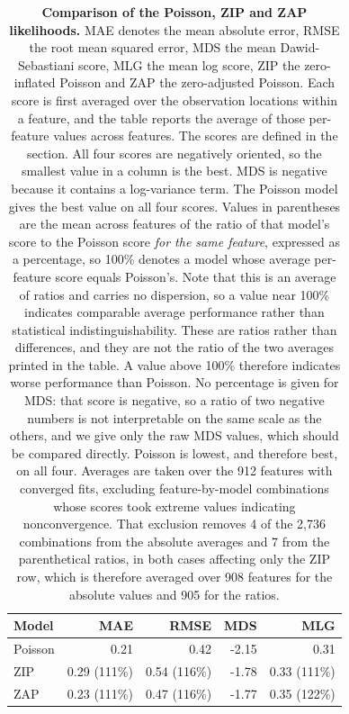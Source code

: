 \documentclass[10pt,letterpaper]{article}
\begin{document}
\begin{table}[!ht]
\centering
\caption{{\bf Comparison of the Poisson, ZIP and ZAP likelihoods.} MAE denotes the mean absolute error, RMSE the root mean squared error, MDS the mean Dawid-Sebastiani score, MLG the mean log score, ZIP the zero-inflated Poisson and ZAP the zero-adjusted Poisson. Each score is first averaged over the observation locations within a feature, and the table reports the average of those per-feature values across features. The scores are defined in the  section. All four scores are negatively oriented, so the smallest value in a column is the best. MDS is negative because it contains a log-variance term. The Poisson model gives the best value on all four scores. Values in parentheses are the mean across features of the ratio of that model's score to the Poisson score \emph{for the same feature}, expressed as a percentage, so 100\% denotes a model whose average per-feature score equals Poisson's. Note that this is an average of ratios and carries no dispersion, so a value near 100\% indicates comparable average performance rather than statistical indistinguishability. These are ratios rather than differences, and they are not the ratio of the two averages printed in the table. A value above 100\% therefore indicates worse performance than Poisson. No percentage is given for MDS: that score is negative, so a ratio of two negative numbers is not interpretable on the same scale as the others, and we give only the raw MDS values, which should be compared directly. Poisson is lowest, and therefore best, on all four. Averages are taken over the 912 features with converged fits, excluding feature-by-model combinations whose scores took extreme values indicating nonconvergence. That exclusion removes 4 of the 2,736 combinations from the absolute averages and 7 from the parenthetical ratios, in both cases affecting only the ZIP row, which is therefore averaged over 908 features for the absolute values and 905 for the ratios.}
\label{tab:lik-comp}
\begin{tabular}{|l|rrrr|}
  \hline
  Model & MAE & RMSE & MDS & MLG \\
  \hline
Poisson & 0.21 & 0.42 & -2.15 & 0.31 \\
ZIP & 0.29 (111\%) & 0.54 (116\%) & -1.78 & 0.33 (111\%) \\
ZAP & 0.23 (111\%)& 0.47 (116\%)& -1.77 & 0.35 (122\%)\\
   \hline
\end{tabular}
\end{table}
\end{document}
